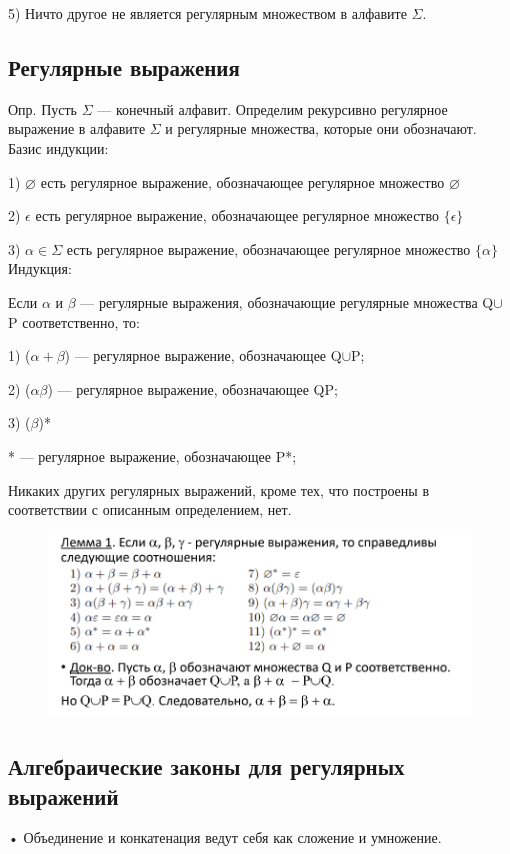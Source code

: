 \documentclass{article}
\begin{document}
5) Ничто другое не является регулярным множеством в алфавите $\Sigma$.

\subsection{Регулярные выражения}


Опр. Пусть $\Sigma$ — конечный алфавит. Определим рекурсивно регулярное
выражение в алфавите $\Sigma$ и регулярные множества, которые они обозначают.
Базис индукции:

1) $\varnothing$ есть регулярное выражение, обозначающее регулярное множество $\varnothing$

2) $\epsilon$ есть регулярное выражение, обозначающее регулярное множество $\{\epsilon\} $

3) $\alpha \in \Sigma$  есть регулярное выражение, обозначающее регулярное множество $\{\alpha\}$
Индукция:

Если $\alpha$ и $\beta$ — регулярные выражения, обозначающие регулярные множества Q$\cup $P соответственно, то:

1) ($\alpha + \beta $) — регулярное выражение, обозначающее Q$\cup$P;

2) ($\alpha \beta $) — регулярное выражение, обозначающее QP;

3) ($\beta$)*

* — регулярное выражение, обозначающее P*;

Никаких других регулярных выражений, кроме тех, что построены в
соответствии с описанным определением, нет.


\begin{figure}[H]
    \centering
    \includegraphics[width=1\linewidth]{Снимок экрана 2025-02-27 085900.png}
\end{figure}



\subsection{Алгебраические законы для регулярных
выражений}
• Объединение и конкатенация ведут себя как сложение и
умножение.
\end{document}
